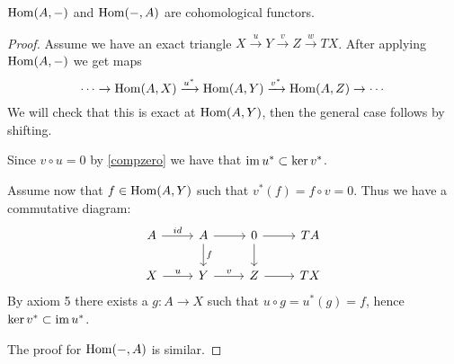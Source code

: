 \documentclass[a4paper, UKenglish]{report}
\begin{document}
\begin{lemma}
$\operatorname{Hom}(A,-)$ and $\operatorname{Hom}(-,A)$ are cohomological functors.
\end{lemma}
\begin{proof}
Assume we have an exact triangle $X \xrightarrow{u} Y \xrightarrow{v} Z \xrightarrow{w} TX$. After applying $\operatorname{Hom}(A,-)$ we get maps
\[ \cdots \to \operatorname{Hom}(A,X) \xrightarrow{u^\ast} \operatorname{Hom}(A,Y) \xrightarrow{v^\ast} \operatorname{Hom}(A,Z) \to \cdots \]
We will check that this is exact at $\operatorname{Hom}(A,Y)$, then the general case follows by shifting.

Since $v \circ u = 0$ by \ref{compzero} we have that $\operatorname{im} u^\ast \subset \ker v^\ast$.

Assume now that $f \in \operatorname{Hom}(A,Y)$ such that $v^\ast(f) = f \circ v = 0$. Thus we have a commutative diagram:
\[
\begin{tikzcd}
A  \ar{r}{id} & A \ar{d}{f} \ar{r} & 0 \arrow{d} \ar{r} &  TA \\
X \ar{r}{u} & Y \ar{r}{v} & Z \ar{r} & TX 
\end{tikzcd} 
\]
By axiom 5 there exists a $g: A \to X$ such that $u \circ g = u^\ast (g) = f$, hence $\ker v^\ast \subset \operatorname{im} u^\ast$.

The proof for $\operatorname{Hom}(-,A)$ is similar.
\end{proof}

\clearpage
\printbibliography
\end{document}
